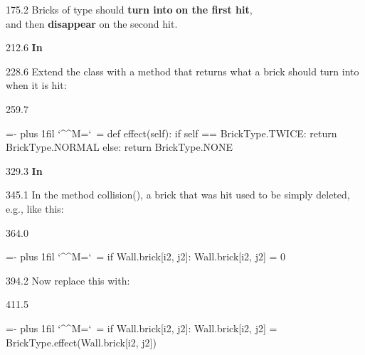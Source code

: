 \documentclass{aslab}
\makeatletter
\newcommand*\kw[1]{\textcolor{codeorange}{#1}}
\newcommand*\fn[1]{\textcolor{codecyan}{#1}}
\newenvironment{pycode}{\par\ttfamily\hyphenchar\font=-1
  \lineskiplimit=-\maxdimen\lineskip=0pt\parindent=0pt
  \parfillskip=0pt plus 1fil\relax
  \catcode`\^^M=\active\catcode`\ =\active\py@setup\py@gobble}{}
\newcommand*\emo[1]{\makebox[18bp][l]{\emoji{#1}}}
\makeatother
\begin{document}
\begin{region}[pitch=14.3]{175.2}
Bricks of type  should \textbf{turn into} 
\textbf{on the first hit},\\
and then \textbf{disappear} on the second hit.
\end{region}

\begin{region}{212.6}
\emo{1F9F1}\textbf{In} 
\end{region}

\begin{region}[pitch=13.3]{228.6}
Extend the class  with a method  that returns
what a brick should turn into when it is hit:
\end{region}

\begin{region}[]{259.7}
\begin{pycode}
    \kw{def} \fn{effect}(self):
        \kw{if} self == BrickType.TWICE:
            \kw{return} BrickType.NORMAL
        \kw{else}:
            \kw{return} BrickType.NONE
\end{pycode}
\end{region}

\begin{region}{329.3}
\emo{1F527}\textbf{In} 
\end{region}

\begin{region}{345.1}
In the method collision(), a brick that was hit used to be simply deleted,
e.g., like this:
\end{region}

\begin{region}[pitch=13.2]{364.0}
\begin{pycode}
    \kw{if} Wall.brick[i2, j2]:
        Wall.brick[i2, j2] = 0
\end{pycode}
\end{region}

\begin{region}{394.2}
Now replace this with:
\end{region}

\begin{region}[]{411.5}
\begin{pycode}
    \kw{if} Wall.brick[i2, j2]:
        Wall.brick[i2, j2] = BrickType.effect(Wall.brick[i2, j2])
\end{pycode}
\end{region}
\end{document}
